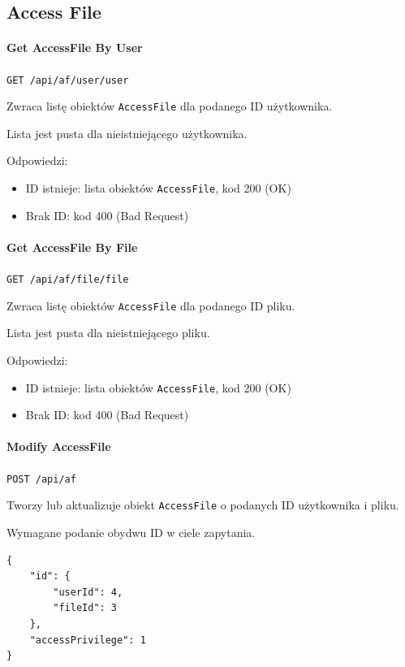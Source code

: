 \documentclass[a4paper,twoside,12pt]{book}
\begin{document}
\subsection{Access File}

\paragraph{Get AccessFile By User}

\texttt{GET /api/af/user/{user}}

Zwraca listę obiektów \texttt{AccessFile} dla podanego ID użytkownika.

Lista jest pusta dla nieistniejącego użytkownika.

Odpowiedzi: 
\begin{itemize}
	\item ID istnieje: lista obiektów \texttt{AccessFile}, kod 200 (OK) 
	\item Brak ID: kod 400 (Bad Request)
\end{itemize}

\paragraph{Get AccessFile By File}

\texttt{GET /api/af/file/{file}}

Zwraca listę obiektów \texttt{AccessFile} dla podanego ID pliku.

Lista jest pusta dla nieistniejącego pliku.

Odpowiedzi: 
\begin{itemize}
	\item ID istnieje: lista obiektów \texttt{AccessFile}, kod 200 (OK) 
	\item Brak ID: kod 400 (Bad Request)
\end{itemize}

\paragraph{Modify AccessFile}

\texttt{POST /api/af}

Tworzy lub aktualizuje obiekt \texttt{AccessFile} o podanych ID użytkownika i pliku.

Wymagane podanie obydwu ID w ciele zapytania.

\begin{verbatim}
{
    "id": {
        "userId": 4,
        "fileId": 3
    },
    "accessPrivilege": 1
}
\end{verbatim}
\end{document}
